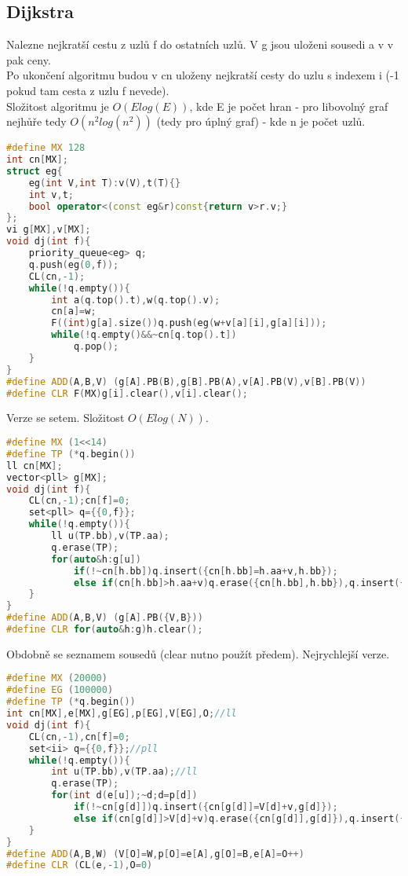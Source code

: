 \documentclass[11pt]{article}
\begin{document}
\subsection{Dijkstra}
Nalezne nejkratší cestu z uzlů \textsf{f} do ostatních uzlů. V \textsf{g} jsou uloženi sousedi a v \textsf{v} pak ceny.
\\Po ukončení algoritmu budou v \textsf{cn} uloženy nejkratší cesty do uzlu s indexem \textsf{i} (-1 pokud tam cesta z uzlu \textsf{f} nevede).
\\Složitost algoritmu je $O(Elog(E))$, kde \textsf{E} je počet hran - pro libovolný graf nejhůře tedy $O(n^2log(n^2))$ (tedy pro úplný graf) - kde \textsf{n} je počet uzlů.
\begin{lstlisting}[language=C++]
#define MX 128
int cn[MX];
struct eg{
    eg(int V,int T):v(V),t(T){}
    int v,t;
    bool operator<(const eg&r)const{return v>r.v;}
};
vi g[MX],v[MX];
void dj(int f){
    priority_queue<eg> q;
    q.push(eg(0,f));
    CL(cn,-1);
    while(!q.empty()){
        int a(q.top().t),w(q.top().v);
        cn[a]=w;
        F((int)g[a].size())q.push(eg(w+v[a][i],g[a][i]));
        while(!q.empty()&&~cn[q.top().t])
            q.pop();
    }
}
#define ADD(A,B,V) (g[A].PB(B),g[B].PB(A),v[A].PB(V),v[B].PB(V))
#define CLR F(MX)g[i].clear(),v[i].clear();
\end{lstlisting}
Verze se setem. Složitost $O(Elog(N))$.
\begin{lstlisting}[language=C++]
#define MX (1<<14)
#define TP (*q.begin())
ll cn[MX];
vector<pll> g[MX];
void dj(int f){
    CL(cn,-1);cn[f]=0;
    set<pll> q={{0,f}};
    while(!q.empty()){
        ll u(TP.bb),v(TP.aa);
        q.erase(TP);
        for(auto&h:g[u])
            if(!~cn[h.bb])q.insert({cn[h.bb]=h.aa+v,h.bb});
            else if(cn[h.bb]>h.aa+v)q.erase({cn[h.bb],h.bb}),q.insert({cn[h.bb]=h.aa+v,h.bb});
    }
}
#define ADD(A,B,V) (g[A].PB({V,B}))
#define CLR for(auto&h:g)h.clear();
\end{lstlisting}
Obdobně se seznamem sousedů (clear nutno použít předem). Nejrychlejší verze.
\begin{lstlisting}[language=C++]
#define MX (20000)
#define EG (100000)
#define TP (*q.begin())
int cn[MX],e[MX],g[EG],p[EG],V[EG],O;//ll
void dj(int f){
    CL(cn,-1),cn[f]=0;
    set<ii> q={{0,f}};//pll
    while(!q.empty()){
        int u(TP.bb),v(TP.aa);//ll
        q.erase(TP);
        for(int d(e[u]);~d;d=p[d])
            if(!~cn[g[d]])q.insert({cn[g[d]]=V[d]+v,g[d]});
            else if(cn[g[d]]>V[d]+v)q.erase({cn[g[d]],g[d]}),q.insert({cn[g[d]]=V[d]+v,g[d]});
    }
}
#define ADD(A,B,W) (V[O]=W,p[O]=e[A],g[O]=B,e[A]=O++)
#define CLR (CL(e,-1),O=0)
\end{lstlisting}
\end{document}
